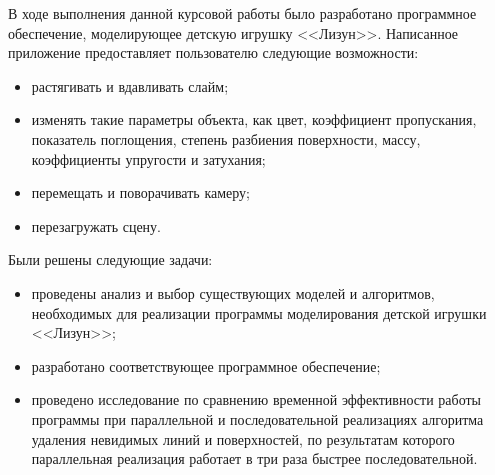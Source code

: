 
В ходе выполнения данной курсовой работы было разработано программное обеспечение, моделирующее детскую игрушку <<Лизун>>. Написанное приложение предоставляет пользователю следующие возможности:

\begin{itemize}
	\item растягивать и вдавливать слайм;
	\item изменять такие параметры объекта, как цвет, коэффициент пропускания, показатель поглощения, степень разбиения поверхности, массу, коэффициенты упругости и затухания;
	\item перемещать и поворачивать камеру;
	\item перезагружать сцену.
\end{itemize}

Были решены следующие задачи:
\begin{itemize}
	\item проведены анализ и выбор существующих моделей и алгоритмов, необходимых для реализации программы моделирования детской игрушки <<Лизун>>;
	\item разработано соответствующее программное обеспечение;
	\item проведено исследование по сравнению временной эффективности работы программы при параллельной и последовательной реализациях алгоритма удаления невидимых линий и поверхностей, по результатам которого параллельная реализация работает в три раза быстрее последовательной.
\end{itemize}
